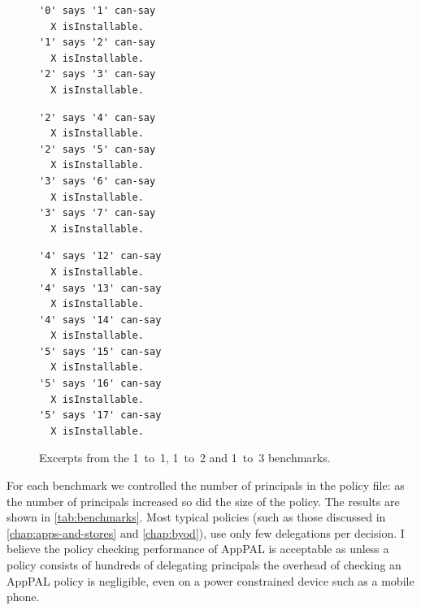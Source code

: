 \documentclass[thesis.tex]{subfiles}
\begin{document}
\noindent
\begin{figure}\centering\footnotesize\sffamily
\begin{minipage}[t]{.32\textwidth}
\begin{lstlisting}[basicstyle=\ttfamily\footnotesize]
'0' says '1' can-say
  X isInstallable.
'1' says '2' can-say
  X isInstallable.
'2' says '3' can-say
  X isInstallable.
\end{lstlisting}
\end{minipage}\hfill
\begin{minipage}[t]{.32\textwidth}
\begin{lstlisting}[basicstyle=\ttfamily\footnotesize]
'2' says '4' can-say
  X isInstallable.
'2' says '5' can-say
  X isInstallable.
'3' says '6' can-say
  X isInstallable.
'3' says '7' can-say
  X isInstallable.
\end{lstlisting}
\end{minipage}\hfill
\begin{minipage}[t]{.32\textwidth}
\begin{lstlisting}[basicstyle=\ttfamily\footnotesize]
'4' says '12' can-say
  X isInstallable.
'4' says '13' can-say
  X isInstallable.
'4' says '14' can-say
  X isInstallable.
'5' says '15' can-say
  X isInstallable.
'5' says '16' can-say
  X isInstallable.
'5' says '17' can-say
  X isInstallable.
\end{lstlisting}
\end{minipage}
\caption{Excerpts from the 1~to~1, 1~to~2 and 1~to~3 benchmarks.}
\label{fig:benchmark-excerpts}
\end{figure}

For each benchmark we controlled the number of principals in the policy file:
as the number of principals increased so did the size of the policy.
The results are shown in \autoref{tab:benchmarks}.
Most typical policies (such as those discussed in \autoref{chap:apps-and-stores} and \autoref{chap:byod}), use only few delegations per decision.
I believe the policy checking performance of AppPAL is acceptable as unless a policy consists of hundreds of delegating principals the overhead of checking an AppPAL policy is negligible, even on a power constrained device such as a mobile phone.
\end{document}
